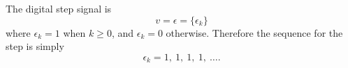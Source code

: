 The digital step signal is
\begin{equation}\label{eq:l10e5}
  v = \epsilon = \{\epsilon_k\}
\end{equation}
where $\epsilon_k = 1$ when $k \ge 0$, and $\epsilon_k = 0$
otherwise. Therefore the sequence for the step is simply
\[\epsilon_k = 1,\ 1,\ 1,\ 1,\ \ldots.\]
\endinput
